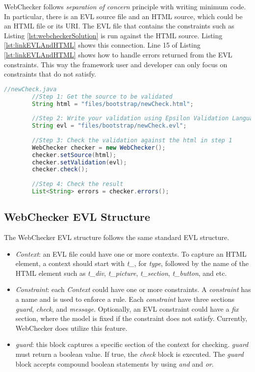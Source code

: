 \documentclass[conference]{IEEETran}
\begin{document}
WebChecker follows \textit{separation of concern} principle with writing minimum code. In particular, there is an EVL source file and an HTML source, which could be an HTML file or its URI. The EVL file that contains the constraints such as Listing \ref{lst:webcheckerSolution} is run against the HTML source. Listing \ref{lst:linkEVLAndHTML} shows this connection. Line 15 of Listing \ref{lst:linkEVLAndHTML} shows how to handle errors returned from the EVL constraints. This way the framework user and developer can only focus on constraints that do not satisfy.   

\begin{lstlisting}[language=Java, caption=Checking an EVL file against an HTML source file, label={lst:linkEVLAndHTML}]
 	//newCheck.java    
		//Step 1: Get the source to be validated
		String html = "files/bootstrap/newCheck.html";
		
		//Step 2: Write your validation using Epsilon Validation Language
		String evl = "files/bootstrap/newCheck.evl";
		
		//Step 3: Check the validation against the html in step 1
		WebChecker checker = new WebChecker();
		checker.setSource(html);
		checker.setValidation(evl);
		checker.check();
		
		//Step 4: Check the result
		List<String> errors = checker.errors();


\end{lstlisting}

\subsection{WebChecker EVL Structure}
The WebChecker EVL structure follows the same standard EVL structure. 
\begin{itemize}
\item \textit{Context}: an EVL file could have one or more contexts. To capture an HTML element, a context should start with \textit{t\_}, for \textit{type}, followed by the name of the HTML element such as \textit{t\_div}, \textit{t\_picture}, \textit{t\_section}, \textit{t\_button}, and etc.
\item \textit{Constraint}: each \textit{Context} could have one or more constraints. A \textit{constraint} has a name and is used to enforce a rule. Each \textit{constraint} have three sections \textit{guard}, \textit{check}, and \textit{message}. Optionally, an EVL constraint could have a \textit{fix} section, where the model is fixed if the constraint does not satisfy. Currently, WebChecker does utilize this feature.
\item \textit{guard}: this block captures a specific section of the context for checking. \textit{guard} must return a boolean value. If true, the \textit{check} block is executed. The \textit{guard} block accepts compound boolean statements by using \textit{and} and \textit{or}.      
\end{itemize}
\end{document}
